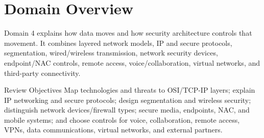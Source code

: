 \documentclass[10pt,letterpaper]{article}
\title{\CornellDocumentTitle}
\author{Arthur Deane and Aaron Kraus}
\date{\today}
\begin{document}
\maketitle

\section*{Domain Overview}
Domain 4 explains how data moves and how security architecture controls that movement. It combines layered network models, IP and secure protocols, segmentation, wired/wireless transmission, network security devices, endpoint/NAC controls, remote access, voice/collaboration, virtual networks, and third-party connectivity.

\begin{summarybox}{Review Objectives}
Map technologies and threats to OSI/TCP-IP layers; explain IP networking and secure protocols; design segmentation and wireless security; distinguish network devices/firewall types; secure media, endpoints, NAC, and mobile systems; and choose controls for voice, collaboration, remote access, VPNs, data communications, virtual networks, and external partners.
\end{summarybox}
\end{document}
